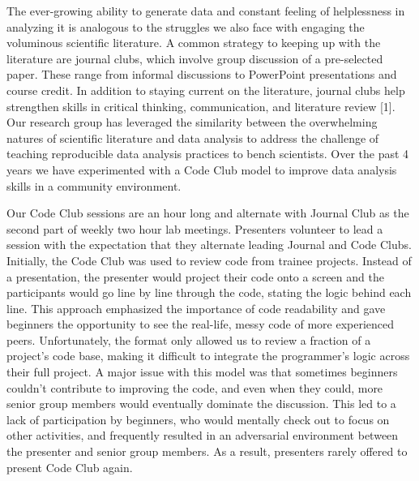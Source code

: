 \documentclass[11pt,]{article}
\begin{document}
The ever-growing ability to generate data and constant feeling of
helplessness in analyzing it is analogous to the struggles we also face
with engaging the voluminous scientific literature. A common strategy to
keeping up with the literature are journal clubs, which involve group
discussion of a pre-selected paper. These range from informal
discussions to PowerPoint presentations and course credit. In addition
to staying current on the literature, journal clubs help strengthen
skills in critical thinking, communication, and literature review
{[}1{]}. Our research group has leveraged the similarity between the
overwhelming natures of scientific literature and data analysis to
address the challenge of teaching reproducible data analysis practices
to bench scientists. Over the past 4 years we have experimented with a
Code Club model to improve data analysis skills in a community
environment.

Our Code Club sessions are an hour long and alternate with Journal Club
as the second part of weekly two hour lab meetings. Presenters volunteer
to lead a session with the expectation that they alternate leading
Journal and Code Clubs. Initially, the Code Club was used to review code
from trainee projects. Instead of a presentation, the presenter would
project their code onto a screen and the participants would go line by
line through the code, stating the logic behind each line. This approach
emphasized the importance of code readability and gave beginners the
opportunity to see the real-life, messy code of more experienced peers.
Unfortunately, the format only allowed us to review a fraction of a
project's code base, making it difficult to integrate the programmer's
logic across their full project. A major issue with this model was that
sometimes beginners couldn't contribute to improving the code, and even
when they could, more senior group members would eventually dominate the
discussion. This led to a lack of participation by beginners, who would
mentally check out to focus on other activities, and frequently resulted
in an adversarial environment between the presenter and senior group
members. As a result, presenters rarely offered to present Code Club
again.
\end{document}
